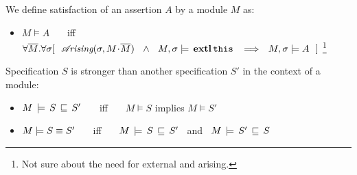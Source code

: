 {{\begin{definition} 
\label{def:assertion-inference-semantics}
We define satisfaction of an assertion $A$ by a  module $M$ as:
\begin{itemize}
\item
{
$M \models A$   \ \ \ iff \ \ \  $\forall \overline{M}. \forall \sigma
[\ \    \arising{\sigma}{M\madd\overline{M}}\   \  \wedge\ \  \satisfiesA {M}   {\sigma} {\external{\prg{this}}} 
\   \ \Longrightarrow \ \ \satisfiesA{M}{\sigma}{A}\ \ ]$
}\footnote{Not sure about the need for external and arising.}
\end{itemize}
\end{definition}


\begin{definition} 
\label{def:specification-implication-semantics}
Specification $S$ is stronger than another specification $S'$  in the context of a  module: 
 \begin{itemize}[itemsep=5pt]
\item 
$M\, \models\, S\, \sqsubseteq\, S'$   \ \ \ iff \ \ \  $M\models S$ implies $M \models S'$
\item
$M \models S  \equiv  S'$   \ \ \ iff \ \ \ $M\, \models\, S\, \sqsubseteq\, S'$  \ and \  $M\, \models\, S'\, \sqsubseteq\, S$    
\end{itemize}
\end{definition}

}}

